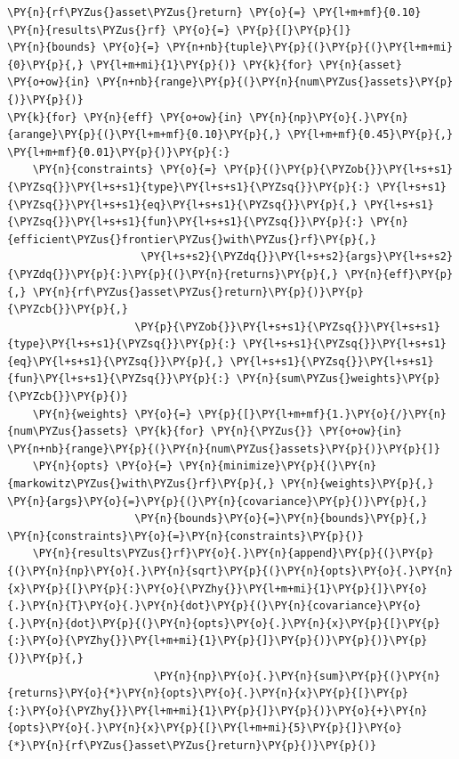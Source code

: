 \begin{codebox}
\begin{Verbatim}[commandchars=\\\{\}]
\PY{n}{rf\PYZus{}asset\PYZus{}return} \PY{o}{=} \PY{l+m+mf}{0.10}
\PY{n}{results\PYZus{}rf} \PY{o}{=} \PY{p}{[}\PY{p}{]}
\PY{n}{bounds} \PY{o}{=} \PY{n+nb}{tuple}\PY{p}{(}\PY{p}{(}\PY{l+m+mi}{0}\PY{p}{,} \PY{l+m+mi}{1}\PY{p}{)} \PY{k}{for} \PY{n}{asset} \PY{o+ow}{in} \PY{n+nb}{range}\PY{p}{(}\PY{n}{num\PYZus{}assets}\PY{p}{)}\PY{p}{)}
\PY{k}{for} \PY{n}{eff} \PY{o+ow}{in} \PY{n}{np}\PY{o}{.}\PY{n}{arange}\PY{p}{(}\PY{l+m+mf}{0.10}\PY{p}{,} \PY{l+m+mf}{0.45}\PY{p}{,} \PY{l+m+mf}{0.01}\PY{p}{)}\PY{p}{:}
    \PY{n}{constraints} \PY{o}{=} \PY{p}{(}\PY{p}{\PYZob{}}\PY{l+s+s1}{\PYZsq{}}\PY{l+s+s1}{type}\PY{l+s+s1}{\PYZsq{}}\PY{p}{:} \PY{l+s+s1}{\PYZsq{}}\PY{l+s+s1}{eq}\PY{l+s+s1}{\PYZsq{}}\PY{p}{,} \PY{l+s+s1}{\PYZsq{}}\PY{l+s+s1}{fun}\PY{l+s+s1}{\PYZsq{}}\PY{p}{:} \PY{n}{efficient\PYZus{}frontier\PYZus{}with\PYZus{}rf}\PY{p}{,} 
                     \PY{l+s+s2}{\PYZdq{}}\PY{l+s+s2}{args}\PY{l+s+s2}{\PYZdq{}}\PY{p}{:}\PY{p}{(}\PY{n}{returns}\PY{p}{,} \PY{n}{eff}\PY{p}{,} \PY{n}{rf\PYZus{}asset\PYZus{}return}\PY{p}{)}\PY{p}{\PYZcb{}}\PY{p}{,}
                    \PY{p}{\PYZob{}}\PY{l+s+s1}{\PYZsq{}}\PY{l+s+s1}{type}\PY{l+s+s1}{\PYZsq{}}\PY{p}{:} \PY{l+s+s1}{\PYZsq{}}\PY{l+s+s1}{eq}\PY{l+s+s1}{\PYZsq{}}\PY{p}{,} \PY{l+s+s1}{\PYZsq{}}\PY{l+s+s1}{fun}\PY{l+s+s1}{\PYZsq{}}\PY{p}{:} \PY{n}{sum\PYZus{}weights}\PY{p}{\PYZcb{}}\PY{p}{)}
    \PY{n}{weights} \PY{o}{=} \PY{p}{[}\PY{l+m+mf}{1.}\PY{o}{/}\PY{n}{num\PYZus{}assets} \PY{k}{for} \PY{n}{\PYZus{}} \PY{o+ow}{in} \PY{n+nb}{range}\PY{p}{(}\PY{n}{num\PYZus{}assets}\PY{p}{)}\PY{p}{]}
    \PY{n}{opts} \PY{o}{=} \PY{n}{minimize}\PY{p}{(}\PY{n}{markowitz\PYZus{}with\PYZus{}rf}\PY{p}{,} \PY{n}{weights}\PY{p}{,} \PY{n}{args}\PY{o}{=}\PY{p}{(}\PY{n}{covariance}\PY{p}{)}\PY{p}{,}
                    \PY{n}{bounds}\PY{o}{=}\PY{n}{bounds}\PY{p}{,} \PY{n}{constraints}\PY{o}{=}\PY{n}{constraints}\PY{p}{)}
    \PY{n}{results\PYZus{}rf}\PY{o}{.}\PY{n}{append}\PY{p}{(}\PY{p}{(}\PY{n}{np}\PY{o}{.}\PY{n}{sqrt}\PY{p}{(}\PY{n}{opts}\PY{o}{.}\PY{n}{x}\PY{p}{[}\PY{p}{:}\PY{o}{\PYZhy{}}\PY{l+m+mi}{1}\PY{p}{]}\PY{o}{.}\PY{n}{T}\PY{o}{.}\PY{n}{dot}\PY{p}{(}\PY{n}{covariance}\PY{o}{.}\PY{n}{dot}\PY{p}{(}\PY{n}{opts}\PY{o}{.}\PY{n}{x}\PY{p}{[}\PY{p}{:}\PY{o}{\PYZhy{}}\PY{l+m+mi}{1}\PY{p}{]}\PY{p}{)}\PY{p}{)}\PY{p}{)}\PY{p}{,} 
                       \PY{n}{np}\PY{o}{.}\PY{n}{sum}\PY{p}{(}\PY{n}{returns}\PY{o}{*}\PY{n}{opts}\PY{o}{.}\PY{n}{x}\PY{p}{[}\PY{p}{:}\PY{o}{\PYZhy{}}\PY{l+m+mi}{1}\PY{p}{]}\PY{p}{)}\PY{o}{+}\PY{n}{opts}\PY{o}{.}\PY{n}{x}\PY{p}{[}\PY{l+m+mi}{5}\PY{p}{]}\PY{o}{*}\PY{n}{rf\PYZus{}asset\PYZus{}return}\PY{p}{)}\PY{p}{)}
\end{Verbatim}
\end{codebox}

